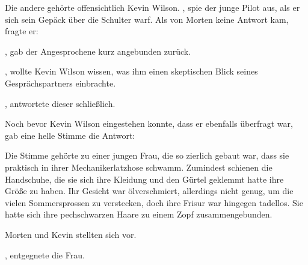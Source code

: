 \par

Die andere gehörte offensichtlich Kevin Wilson. , spie der junge Pilot aus, als er sich sein Gepäck über die Schulter warf. Als von Morten keine Antwort kam, fragte er: 

\par

, gab der Angesprochene kurz angebunden zurück.

\par

, wollte Kevin Wilson wissen, was ihm einen skeptischen Blick seines Gesprächspartners einbrachte.

\par

, antwortete dieser schließlich. 

\par

Noch bevor Kevin Wilson eingestehen konnte, dass er ebenfalls überfragt war, gab eine helle Stimme die Antwort: 

\par

Die Stimme gehörte zu einer jungen Frau, die so zierlich gebaut war, dass sie praktisch in ihrer Mechanikerlatzhose schwamm. Zumindest schienen die Handschuhe, die sie sich ihre Kleidung und den Gürtel geklemmt hatte ihre Größe zu haben. Ihr Gesicht war ölverschmiert, allerdings nicht genug, um die vielen Sommersprossen zu verstecken, doch ihre Frisur war hingegen tadellos. Sie hatte sich ihre pechschwarzen Haare zu einem Zopf zusammengebunden.

\par

Morten und Kevin stellten sich vor.

\par

, entgegnete die Frau. 

\par

